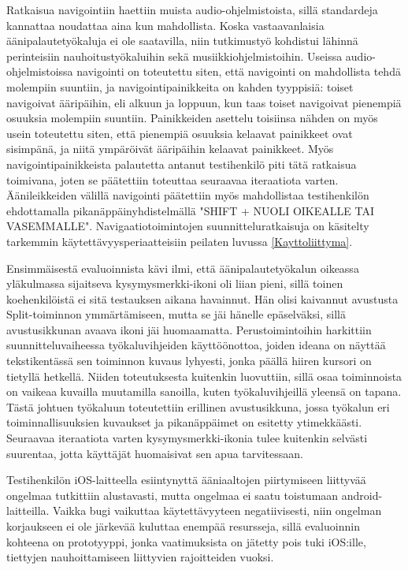 \documentclass[utf8]{gradu3}
\begin{document}
Ratkaisua navigointiin haettiin muista audio-ohjelmistoista, sillä standardeja kannattaa noudattaa aina kun mahdollista. Koska vastaavanlaisia äänipalautetyökaluja ei ole saatavilla, niin tutkimustyö kohdistui lähinnä perinteisiin nauhoitustyökaluihin sekä musiikkiohjelmistoihin. Useissa audio-ohjelmistoissa navigointi on toteutettu siten, että navigointi on mahdollista tehdä molempiin suuntiin, ja navigointipainikkeita on kahden tyyppisiä: toiset navigoivat ääripäihin, eli alkuun ja loppuun, kun taas toiset navigoivat pienempiä osuuksia molempiin suuntiin. Painikkeiden asettelu toisiinsa nähden on myös usein toteutettu siten, että pienempiä osuuksia kelaavat painikkeet ovat sisimpänä, ja niitä ympäröivät ääripäihin kelaavat painikkeet. Myös navigointipainikkeista palautetta antanut testihenkilö piti tätä ratkaisua toimivana, joten se päätettiin toteuttaa seuraavaa iteraatiota varten. Äänileikkeiden välillä navigointi päätettiin myös mahdollistaa testihenkilön ehdottamalla pikanäppäinyhdistelmällä "SHIFT + NUOLI OIKEALLE TAI VASEMMALLE". Navigaatiotoimintojen suunnitteluratkaisuja on käsitelty tarkemmin käytettävyysperiaatteisiin peilaten luvussa \ref{Kayttoliittyma}.

Ensimmäisestä evaluoinnista kävi ilmi, että äänipalautetyökalun oikeassa yläkulmassa sijaitseva kysymysmerkki-ikoni oli liian pieni, sillä toinen koehenkilöistä ei sitä testauksen aikana havainnut. Hän olisi kaivannut avustusta Split-toiminnon ymmärtämiseen, mutta se jäi hänelle epäselväksi, sillä avustusikkunan avaava ikoni jäi huomaamatta. Perustoimintoihin harkittiin suunnitteluvaiheessa työkaluvihjeiden käyttöönottoa, joiden ideana on näyttää tekstikentässä sen toiminnon kuvaus lyhyesti, jonka päällä hiiren kursori on tietyllä hetkellä. Niiden toteutuksesta kuitenkin luovuttiin, sillä osaa toiminnoista on vaikeaa kuvailla muutamilla sanoilla, kuten työkaluvihjeillä yleensä on tapana. Tästä johtuen työkaluun toteutettiin erillinen avustusikkuna, jossa työkalun eri toiminnallisuuksien kuvaukset ja pikanäppäimet on esitetty ytimekkäästi. Seuraavaa iteraatiota varten kysymysmerkki-ikonia tulee kuitenkin selvästi suurentaa, jotta käyttäjät huomaisivat sen apua tarvitessaan.

Testihenkilön iOS-laitteella esiintynyttä ääniaaltojen piirtymiseen liittyvää ongelmaa tutkittiin alustavasti, mutta ongelmaa ei saatu toistumaan android-laitteilla. Vaikka bugi vaikuttaa käytettävyyteen negatiivisesti, niin ongelman korjaukseen ei ole järkevää kuluttaa enempää resursseja, sillä evaluoinnin kohteena on prototyyppi, jonka vaatimuksista on jätetty pois tuki iOS:ille, tiettyjen nauhoittamiseen liittyvien rajoitteiden vuoksi. 
\end{document}
